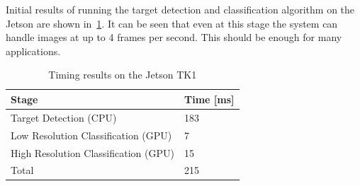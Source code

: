 \documentclass{article} %
\begin{document}
Initial results of running the target detection and classification algorithm on
the Jetson are shown in~\cref{tb:jetson1}. It can be seen that even at this
stage the system can handle images at up to 4 frames per second. This should be
enough for many applications.
\begin{table}
	\centering
	\begin{tabular}{ | l | l | }
		\hline
		Stage                                & Time [ms] \\ \hline
		Target Detection (CPU)               & 183       \\ \hline
		Low Resolution Classification (GPU)  & 7         \\ \hline
		High Resolution Classification (GPU) & 15        \\ \hline
		Total                                & 215       \\ \hline
	\end{tabular}
	\caption{Timing results on the Jetson TK1}
	\label{tb:jetson1}
\end{table}
\end{document}
